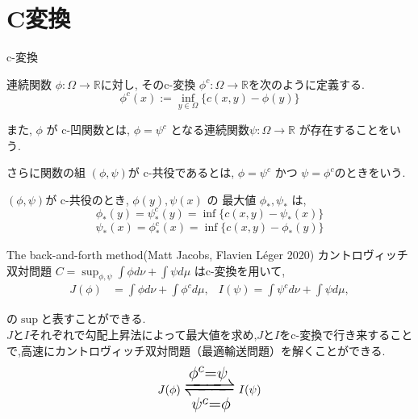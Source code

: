 \documentclass[dvipdfmx, 12pt]{beamer}
\begin{document}
\section{C変換}

\begin{frame}{c-変換}
    \begin{definition}[c-変換]

        連続関数 $\phi: \Omega \to \mathbb{R}$に対し, そのc-変換 $\phi^c: \Omega \to \mathbb{R}$を次のように定義する.
        \begin{equation*}
            \phi^c(x) := \inf_{y \in \Omega} \{ c(x, y) - \phi(y) \}
        \end{equation*}

        また, $\phi$ が c-凹関数とは, $\phi = \psi^c$ となる連続関数$\psi: \Omega \to \mathbb{R}$ が存在することをいう.

        さらに関数の組 $(\phi, \psi)$が c-共役であるとは, $\phi = \psi^c$ かつ $\psi = \phi^c$のときをいう.

    \end{definition}
    $(\phi, \psi)$が c-共役のとき, $\phi (y), \psi (x)$ の 最大値 $\phi_*, \psi_*$  は,
    \begin{equation*}
        \phi_*(y) = \psi_*^c(y) = \inf\{c(x, y) - \psi_*(x) \}
    \end{equation*}
    \begin{equation*}
        \psi_*(x) = \phi_*^c(x) = \inf\{c(x, y) - \phi_*(y) \}
    \end{equation*}
\end{frame}



\begin{frame}{The back-and-forth method(Matt Jacobs, Flavien Léger 2020)}
    カントロヴィッチ双対問題
    $C = \sup_{\phi, \psi} \int \phi  d\nu + \int \psi  d\mu $
    はc-変換を用いて,
    \begin{align*}
        J(\phi) &= \int \phi  d \nu + \int \phi^c  d \mu, &
        I(\psi) = \int \psi^c  d \nu + \int \psi  d \mu, 
    \end{align*}

    の$\sup$と表すことができる.\\
    \vspace{\baselineskip}
    $J$と$I$それぞれで勾配上昇法によって最大値を求め,$J$と$I$をc-変換で行き来することで,高速にカントロヴィッチ双対問題（最適輸送問題）を解くことができる.\\
    
    \begin{equation*}
        \huge J(\phi) \xrightleftharpoons[\psi^c = \phi]{\phi^c = \psi} I(\psi)
    \end{equation*}
    
\end{frame}
\end{document}
